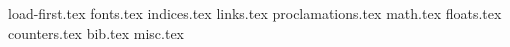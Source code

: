 {load-first.tex}
{fonts.tex}
{indices.tex}
{links.tex}
{proclamations.tex}
{math.tex}
{floats.tex}
{counters.tex}
{bib.tex}
{misc.tex}
